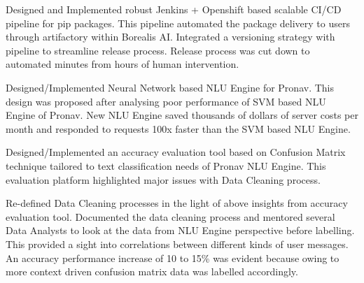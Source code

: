 \documentclass[]{deedy-resume-openfont}
\begin{document}
\begin{minipage}[t]{0.63\textwidth}
\begin{tightemize}
\item Designed and Implemented robust Jenkins + Openshift based scalable CI/CD pipeline for pip packages. This pipeline automated the package delivery to users through artifactory within Borealis AI. Integrated a versioning strategy with pipeline to streamline release process. Release process was cut down to automated minutes from hours of human intervention.


\end{tightemize}
\sectionsep

\vspace{\topsep} %
\begin{tightemize}

\item Designed/Implemented Neural Network based NLU Engine for Pronav. This design was proposed after analysing poor performance of SVM based NLU Engine of Pronav. New NLU Engine saved thousands of dollars of server costs per month and responded to requests 100x faster than the SVM based NLU Engine. 

\item Designed/Implemented an accuracy evaluation tool based on Confusion Matrix technique tailored to text classification needs of Pronav NLU Engine. This evaluation platform highlighted major issues with Data Cleaning process. 

\item Re-defined Data Cleaning processes in the light of above insights from accuracy evaluation tool. Documented the data cleaning process and mentored several Data Analysts to look at the data from NLU Engine perspective before labelling. This provided a sight into correlations between different kinds of user messages. An accuracy performance increase of 10 to 15\% was evident because owing to more context driven confusion matrix data was labelled accordingly.


\end{tightemize}
\sectionsep


\end{minipage}
\end{document}
